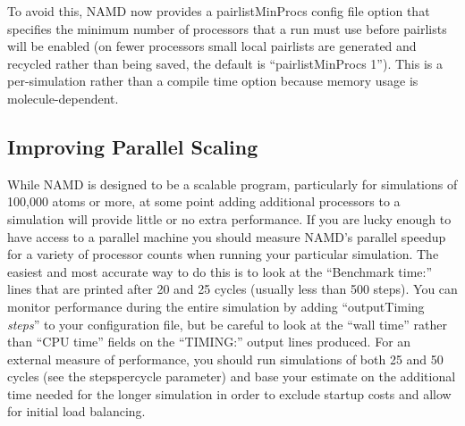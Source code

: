 To avoid this, NAMD now provides a pairlistMinProcs config file option
that specifies the minimum number of processors that a run must use
before pairlists will be enabled (on fewer processors small local
pairlists are generated and recycled rather than being saved, the
default is ``pairlistMinProcs 1'').  This is a per-simulation rather than
a compile time option because memory usage is molecule-dependent.

\subsection{Improving Parallel Scaling}

While NAMD is designed to be a scalable program, particularly for
simulations of 100,000 atoms or more, at some point adding additional
processors to a simulation will provide little or no extra performance.
If you are lucky enough to have access to a parallel machine you should
measure NAMD's parallel speedup for a variety of processor counts when
running your particular simulation.  The easiest and most accurate way
to do this is to look at the ``Benchmark time:'' lines that are printed
after 20 and 25 cycles (usually less than 500 steps).  You can monitor
performance during the entire simulation by adding ``outputTiming {\em steps}''
to your configuration file, but be careful to look at the ``wall time''
rather than ``CPU time'' fields on the ``TIMING:'' output lines produced.
For an external measure of performance, you should run simulations of
both 25 and 50 cycles (see the stepspercycle parameter) and base your
estimate on the additional time needed for the longer simulation in
order to exclude startup costs and allow for initial load balancing.


